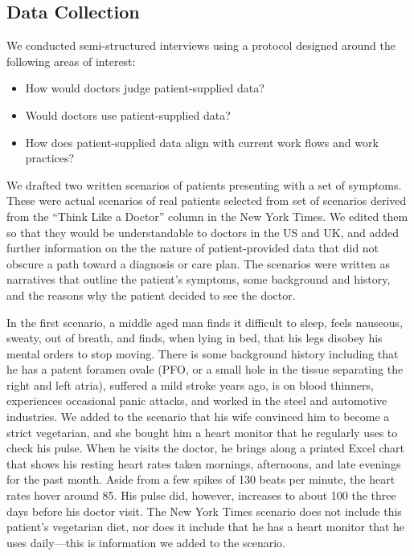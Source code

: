 \documentclass{sigchi}
\begin{document}
\subsection{Data Collection}
We conducted semi-structured interviews using a protocol designed around the following areas of interest:
\begin{itemize}
    \item How would doctors judge patient-supplied data?
    \item Would doctors use patient-supplied data?
    \item How does patient-supplied data align with current work flows and work practices?
\end{itemize}

We drafted two written scenarios of patients presenting with a set of symptoms.  These were actual scenarios of real patients selected from set of scenarios derived from the ``Think Like a Doctor'' column in the New York Times.  We edited them so that they would be understandable to doctors in the US and UK, and added further information on the the nature of patient-provided data that did not obscure a path toward a diagnosis or care plan.  The scenarios were written as narratives that outline the patient’s symptoms, some background and history, and the reasons why the patient decided to see the doctor.  

In the first scenario, a middle aged man finds it difficult to sleep, feels nauseous, sweaty, out of breath, and finds, when lying in bed, that his legs disobey his mental orders to stop moving.   There is some background history including that he has a patent foramen ovale (PFO, or a small hole in the tissue separating the right and left atria), suffered a mild stroke years ago, is on blood thinners, experiences occasional panic attacks, and worked in the steel and automotive industries.  We added to the scenario that his wife convinced him to become a strict vegetarian, and she bought him a heart monitor that he regularly uses to check his pulse. When he visits the doctor, he brings along a printed Excel chart that shows his resting heart rates taken mornings, afternoons, and late evenings for the past month. Aside from a few spikes of 130 beats per minute, the heart rates hover around 85.  His pulse did, however, increases to about 100 the three days before his doctor visit.  The New York Times scenario does not include this patient’s vegetarian diet, nor does it include that he has a heart monitor that he uses daily—this is information we added to the scenario.
\end{document}
